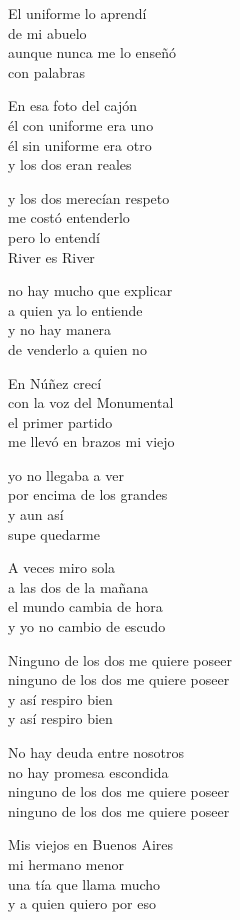 \begin{lyrics}
El uniforme lo aprendí\\
de mi abuelo\\
aunque nunca me lo enseñó\\
con palabras

En esa foto del cajón\\
él con uniforme era uno\\
él sin uniforme era otro\\
y los dos eran reales

y los dos merecían respeto\\
me costó entenderlo\\
pero lo entendí\\
River es River

no hay mucho que explicar\\
a quien ya lo entiende\\
y no hay manera\\
de venderlo a quien no

En Núñez crecí\\
con la voz del Monumental\\
el primer partido\\
me llevó en brazos mi viejo

yo no llegaba a ver\\
por encima de los grandes\\
y aun así\\
supe quedarme

A veces miro sola\\
a las dos de la mañana\\
el mundo cambia de hora\\
y yo no cambio de escudo

Ninguno de los dos me quiere poseer\\
ninguno de los dos me quiere poseer\\
y así respiro bien\\
y así respiro bien

No hay deuda entre nosotros\\
no hay promesa escondida\\
ninguno de los dos me quiere poseer\\
ninguno de los dos me quiere poseer

Mis viejos en Buenos Aires\\
mi hermano menor\\
una tía que llama mucho\\
y a quien quiero por eso


\end{lyrics}
